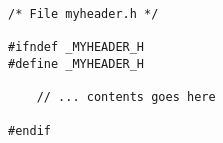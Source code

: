 \begin{lstlisting}[caption=Gebruik van een macro om een header-bestand één keer in te lezen.,label=cod:preheaderinc]
/* File myheader.h */

#ifndef _MYHEADER_H
#define _MYHEADER_H

    // ... contents goes here
    
#endif
\end{lstlisting}

